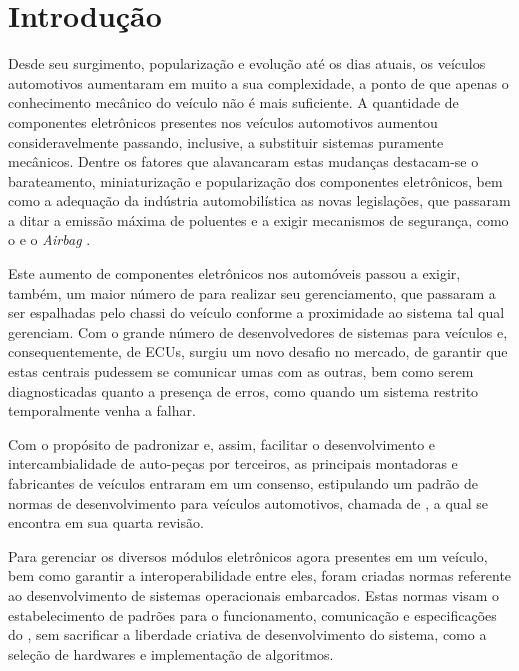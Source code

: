\chapter{Introdução}

Desde seu surgimento, popularização e evolução até os dias atuais, os veículos automotivos aumentaram em muito a sua complexidade, a ponto de que apenas o conhecimento mecânico do veículo não é mais suficiente. A quantidade de componentes eletrônicos presentes nos veículos automotivos aumentou consideravelmente passando, inclusive, a substituir sistemas puramente mecânicos. Dentre os fatores que alavancaram estas mudanças destacam-se o barateamento, miniaturização e popularização dos componentes eletrônicos, bem como a adequação da indústria automobilística as novas legislações, que passaram a ditar a emissão máxima de poluentes e a exigir mecanismos de segurança, como o  e o \emph{Airbag} \cite{Auto:Lion2008}.

Este aumento de componentes eletrônicos nos automóveis passou a exigir, também, um maior número de  para realizar seu gerenciamento, que passaram a ser espalhadas pelo chassi do veículo conforme a proximidade ao sistema tal qual gerenciam. Com o grande número de desenvolvedores de sistemas para veículos e, consequentemente, de ECUs, surgiu um novo desafio no mercado, de garantir que estas centrais pudessem se comunicar umas com as outras, bem como serem diagnosticadas quanto a presença de erros, como quando um sistema restrito temporalmente venha a falhar.

Com o propósito de padronizar e, assim, facilitar o desenvolvimento e intercambialidade de auto-peças por terceiros, as principais montadoras e fabricantes de veículos entraram em um consenso, estipulando um padrão de normas de desenvolvimento para veículos automotivos, chamada de , a qual se encontra em sua quarta revisão.

Para gerenciar os diversos módulos eletrônicos agora presentes em um veículo, bem como garantir a interoperabilidade entre eles, foram criadas normas referente ao desenvolvimento de sistemas operacionais embarcados. Estas normas visam o estabelecimento de padrões para o funcionamento, comunicação e especificações do , sem sacrificar a liberdade criativa de desenvolvimento do sistema, como a seleção de hardwares e implementação de algoritmos.

